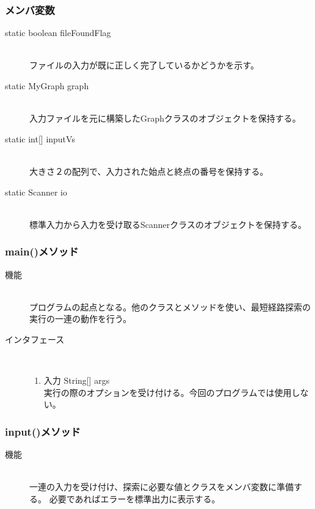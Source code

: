 \documentclass[a4j]{jarticle}
\begin{document}
\begin{description}
\begin{description}
\subsubsection{メンバ変数}
\begin{description}
\item[static boolean fileFoundFlag]\mbox{}\\
ファイルの入力が既に正しく完了しているかどうかを示す。
\item[static MyGraph graph]\mbox{}\\
入力ファイルを元に構築したGraphクラスのオブジェクトを保持する。
\item[static int[\textrm{]} inputVs]\mbox{}\\
大きさ２の配列で、入力された始点と終点の番号を保持する。
\item[static Scanner io]\mbox{}\\
標準入力から入力を受け取るScannerクラスのオブジェクトを保持する。
\end{description}

\subsubsection{main()メソッド}

\begin{description}
\item[機能]\mbox{}\\
プログラムの起点となる。他のクラスとメソッドを使い、最短経路探索の実行の一連の動作を行う。

\item[インタフェース]\
  \begin{enumerate}
  \item 入力 String[] args\mbox{}\\
    実行の際のオプションを受け付ける。今回のプログラムでは使用しない。 
  \end{enumerate}
\end{description}

\subsubsection{input()メソッド}

\begin{description}
\item[機能]\mbox{}\\
一連の入力を受け付け、探索に必要な値とクラスをメンバ変数に準備する。
必要であればエラーを標準出力に表示する。


\end{description}
\end{description}
\end{description}
\end{document}

